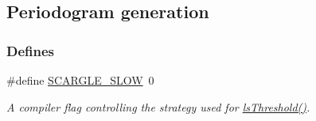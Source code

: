 \hypertarget{group__period}{
\subsection{Periodogram generation}
\label{group__period}
}
\subsubsection*{Defines}
\begin{DoxyCompactItemize}
\item 
\#define \hyperlink{group__period_gae1f03252f094cf8180186c55a9fa635d}{SCARGLE\_\-SLOW}~0
\begin{DoxyCompactList}\small\item\em A compiler flag controlling the strategy used for \hyperlink{group__period_ga86b0f84540eab7eb0793b5ba94899d1e}{lsThreshold()}. \end{DoxyCompactList}\end{DoxyCompactItemize}
